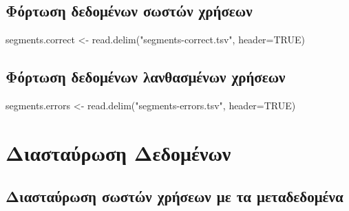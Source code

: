 \documentclass[
]{article}
\newenvironment{Shaded}{\begin{snugshade}}{\end{snugshade}}
\newcommand{\AttributeTok}[1]{\textcolor[rgb]{0.77,0.63,0.00}{#1}}
\newcommand{\ConstantTok}[1]{\textcolor[rgb]{0.00,0.00,0.00}{#1}}
\newcommand{\FunctionTok}[1]{\textcolor[rgb]{0.00,0.00,0.00}{#1}}
\newcommand{\NormalTok}[1]{#1}
\newcommand{\OtherTok}[1]{\textcolor[rgb]{0.56,0.35,0.01}{#1}}
\newcommand{\StringTok}[1]{\textcolor[rgb]{0.31,0.60,0.02}{#1}}
\begin{document}
\hypertarget{ux3c6ux3ccux3c1ux3c4ux3c9ux3c3ux3b7-ux3b4ux3b5ux3b4ux3bfux3bcux3adux3bdux3c9ux3bd-ux3c3ux3c9ux3c3ux3c4ux3ceux3bd-ux3c7ux3c1ux3aeux3c3ux3b5ux3c9ux3bd}{%
\subsection{Φόρτωση δεδομένων σωστών
χρήσεων}\label{ux3c6ux3ccux3c1ux3c4ux3c9ux3c3ux3b7-ux3b4ux3b5ux3b4ux3bfux3bcux3adux3bdux3c9ux3bd-ux3c3ux3c9ux3c3ux3c4ux3ceux3bd-ux3c7ux3c1ux3aeux3c3ux3b5ux3c9ux3bd}}

\begin{Shaded}
\begin{Highlighting}[]
\NormalTok{segments.correct }\OtherTok{\textless{}{-}} \FunctionTok{read.delim}\NormalTok{(}\StringTok{"segments{-}correct.tsv"}\NormalTok{, }\AttributeTok{header=}\ConstantTok{TRUE}\NormalTok{)}
\end{Highlighting}
\end{Shaded}

\hypertarget{ux3c6ux3ccux3c1ux3c4ux3c9ux3c3ux3b7-ux3b4ux3b5ux3b4ux3bfux3bcux3adux3bdux3c9ux3bd-ux3bbux3b1ux3bdux3b8ux3b1ux3c3ux3bcux3adux3bdux3c9ux3bd-ux3c7ux3c1ux3aeux3c3ux3b5ux3c9ux3bd}{%
\subsection{Φόρτωση δεδομένων λανθασμένων
χρήσεων}\label{ux3c6ux3ccux3c1ux3c4ux3c9ux3c3ux3b7-ux3b4ux3b5ux3b4ux3bfux3bcux3adux3bdux3c9ux3bd-ux3bbux3b1ux3bdux3b8ux3b1ux3c3ux3bcux3adux3bdux3c9ux3bd-ux3c7ux3c1ux3aeux3c3ux3b5ux3c9ux3bd}}

\begin{Shaded}
\begin{Highlighting}[]
\NormalTok{segments.errors }\OtherTok{\textless{}{-}} \FunctionTok{read.delim}\NormalTok{(}\StringTok{"segments{-}errors.tsv"}\NormalTok{, }\AttributeTok{header=}\ConstantTok{TRUE}\NormalTok{)}
\end{Highlighting}
\end{Shaded}

\hypertarget{ux3b4ux3b9ux3b1ux3c3ux3c4ux3b1ux3cdux3c1ux3c9ux3c3ux3b7-ux3b4ux3b5ux3b4ux3bfux3bcux3adux3bdux3c9ux3bd}{%
\section{Διασταύρωση
Δεδομένων}\label{ux3b4ux3b9ux3b1ux3c3ux3c4ux3b1ux3cdux3c1ux3c9ux3c3ux3b7-ux3b4ux3b5ux3b4ux3bfux3bcux3adux3bdux3c9ux3bd}}

\hypertarget{ux3b4ux3b9ux3b1ux3c3ux3c4ux3b1ux3cdux3c1ux3c9ux3c3ux3b7-ux3c3ux3c9ux3c3ux3c4ux3ceux3bd-ux3c7ux3c1ux3aeux3c3ux3b5ux3c9ux3bd-ux3bcux3b5-ux3c4ux3b1-ux3bcux3b5ux3c4ux3b1ux3b4ux3b5ux3b4ux3bfux3bcux3adux3bdux3b1}{%
\subsection{Διασταύρωση σωστών χρήσεων με τα
μεταδεδομένα}\label{ux3b4ux3b9ux3b1ux3c3ux3c4ux3b1ux3cdux3c1ux3c9ux3c3ux3b7-ux3c3ux3c9ux3c3ux3c4ux3ceux3bd-ux3c7ux3c1ux3aeux3c3ux3b5ux3c9ux3bd-ux3bcux3b5-ux3c4ux3b1-ux3bcux3b5ux3c4ux3b1ux3b4ux3b5ux3b4ux3bfux3bcux3adux3bdux3b1}}
\end{document}
